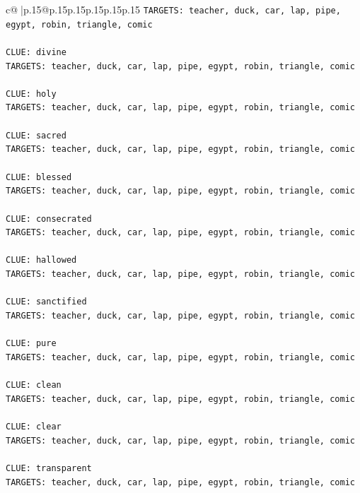 \documentclass{article}
\begin{document}
{\begin{supertabular}{c@{$\;$}|p{.15\linewidth}@{}p{.15\linewidth}p{.15\linewidth}p{.15\linewidth}p{.15\linewidth}p{.15\linewidth}}
{{{\texttt{TARGETS: teacher, duck, car, lap, pipe, egypt, robin, triangle, comic} \\
\\ 
\texttt{CLUE: divine} \\
\texttt{TARGETS: teacher, duck, car, lap, pipe, egypt, robin, triangle, comic} \\
\\ 
\texttt{CLUE: holy} \\
\texttt{TARGETS: teacher, duck, car, lap, pipe, egypt, robin, triangle, comic} \\
\\ 
\texttt{CLUE: sacred} \\
\texttt{TARGETS: teacher, duck, car, lap, pipe, egypt, robin, triangle, comic} \\
\\ 
\texttt{CLUE: blessed} \\
\texttt{TARGETS: teacher, duck, car, lap, pipe, egypt, robin, triangle, comic} \\
\\ 
\texttt{CLUE: consecrated} \\
\texttt{TARGETS: teacher, duck, car, lap, pipe, egypt, robin, triangle, comic} \\
\\ 
\texttt{CLUE: hallowed} \\
\texttt{TARGETS: teacher, duck, car, lap, pipe, egypt, robin, triangle, comic} \\
\\ 
\texttt{CLUE: sanctified} \\
\texttt{TARGETS: teacher, duck, car, lap, pipe, egypt, robin, triangle, comic} \\
\\ 
\texttt{CLUE: pure} \\
\texttt{TARGETS: teacher, duck, car, lap, pipe, egypt, robin, triangle, comic} \\
\\ 
\texttt{CLUE: clean} \\
\texttt{TARGETS: teacher, duck, car, lap, pipe, egypt, robin, triangle, comic} \\
\\ 
\texttt{CLUE: clear} \\
\texttt{TARGETS: teacher, duck, car, lap, pipe, egypt, robin, triangle, comic} \\
\\ 
\texttt{CLUE: transparent} \\
\texttt{TARGETS: teacher, duck, car, lap, pipe, egypt, robin, triangle, comic} \\
}}}
\end{supertabular}}
\end{document}
